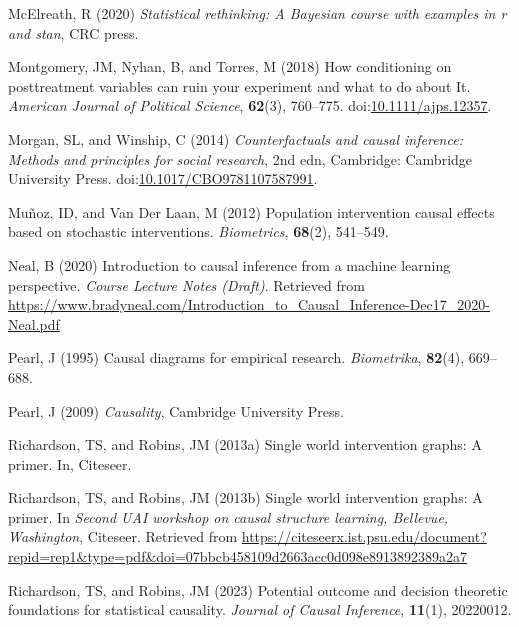 \documentclass[
  single column]{article}
\newlength{\cslhangindent}
\newenvironment{CSLReferences}[2] %
 {\begin{list}{}{%
  \setlength{\itemindent}{0pt}
  \setlength{\leftmargin}{0pt}
  \setlength{\parsep}{0pt}
  \ifodd #1
   \setlength{\leftmargin}{\cslhangindent}
   \setlength{\itemindent}{-1\cslhangindent}
  \fi
  \setlength{\itemsep}{#2\baselineskip}}}
 {\end{list}}
\begin{document}
\begin{CSLReferences}{1}{0}
McElreath, R (2020) \emph{Statistical rethinking: A {B}ayesian course
with examples in r and stan}, CRC press.

Montgomery, JM, Nyhan, B, and Torres, M (2018) How conditioning on
posttreatment variables can ruin your experiment and what to do about
It. \emph{American Journal of Political Science}, \textbf{62}(3),
760--775.
doi:\href{https://doi.org/10.1111/ajps.12357}{10.1111/ajps.12357}.

Morgan, SL, and Winship, C (2014) \emph{Counterfactuals and causal
inference: Methods and principles for social research}, 2nd edn,
Cambridge: Cambridge University Press.
doi:\href{https://doi.org/10.1017/CBO9781107587991}{10.1017/CBO9781107587991}.

Muñoz, ID, and Van Der Laan, M (2012) Population intervention causal
effects based on stochastic interventions. \emph{Biometrics},
\textbf{68}(2), 541--549.

Neal, B (2020) Introduction to causal inference from a machine learning
perspective. \emph{Course Lecture Notes (Draft)}. Retrieved from
\url{https://www.bradyneal.com/Introduction_to_Causal_Inference-Dec17_2020-Neal.pdf}

Pearl, J (1995) Causal diagrams for empirical research.
\emph{Biometrika}, \textbf{82}(4), 669--688.

Pearl, J (2009) \emph{Causality}, Cambridge University Press.

Richardson, TS, and Robins, JM (2013a) Single world intervention graphs:
A primer. In, Citeseer.

Richardson, TS, and Robins, JM (2013b) Single world intervention graphs:
A primer. In \emph{Second UAI workshop on causal structure learning,
{B}ellevue, {W}ashington}, Citeseer. Retrieved from
\url{https://citeseerx.ist.psu.edu/document?repid=rep1&type=pdf&doi=07bbcb458109d2663acc0d098e8913892389a2a7}

Richardson, TS, and Robins, JM (2023) Potential outcome and decision
theoretic foundations for statistical causality. \emph{Journal of Causal
Inference}, \textbf{11}(1), 20220012.


\end{CSLReferences}
\end{document}
